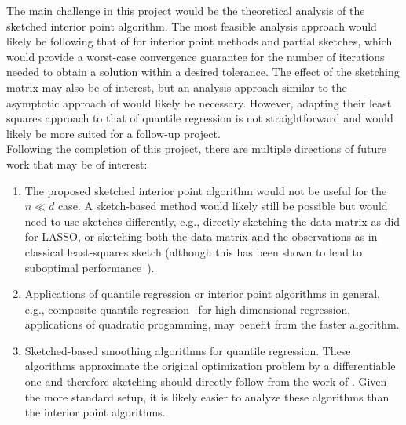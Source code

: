 The main challenge in this project would be the theoretical analysis of the sketched interior point algorithm. The most feasible analysis approach would likely be following that of \citet{Pilanci:2017} for interior point methods and partial sketches, which would provide a worst-case convergence guarantee for the number of iterations needed to obtain a solution within a desired tolerance. The effect of the sketching matrix may also be of interest, but an analysis approach similar to the asymptotic approach of \citet{Lacotte:2020} would likely be necessary. However, adapting their least squares approach to that of quantile regression is not straightforward and would likely be more suited for a follow-up project.
\\

Following the completion of this project, there are multiple directions of future work that may be of interest:
\begin{enumerate}
\item
The proposed sketched interior point algorithm would not be useful for the $n\ll d$ case. A sketch-based method would likely still be possible but would need to use sketches differently, e.g., directly sketching the data matrix as \citet{Pham:2015} did for LASSO, or sketching both the data matrix and the observations as in classical least-squares sketch (although this has been shown to lead to suboptimal performance~\citep{Pilanci:2016}).
\item
Applications of quantile regression or interior point algorithms in general, e.g., composite quantile regression~\citep{Zou:2008} for high-dimensional regression, applications of quadratic progamming, may benefit from the faster algorithm.
\item
Sketched-based smoothing algorithms for quantile regression. These algorithms approximate the original optimization problem by a differentiable one and therefore sketching should directly follow from the work of \citet{Pilanci:2017}. Given the more standard setup, it is likely easier to analyze these algorithms than the interior point algorithms.
\end{enumerate}

\iffalse
\newpage


\subsection{Proposal 2: MY OTHER PROPOSAL TITLE} %

\fi